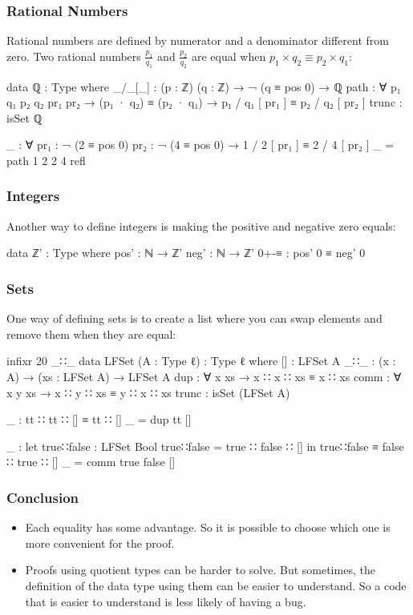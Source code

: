 \documentclass{beamer}
\begin{document}
\begin{frame}
  \frametitle{Rational Numbers}
  Rational numbers are defined by numerator and a denominator different from zero.
  Two rational numbers $ \frac{p_1}{q_1} $ and $ \frac{p_2}{q_2} $ are equal when $ p_1 \times q_2 \equiv p_2 \times q_1 $:
  \begin{code}
  data ℚ : Type where
    _/_[_] : (p : ℤ) (q : ℤ) → ¬ (q ≡ pos 0) → ℚ
    path : ∀ p₁ q₁ p₂ q₂ {pr₁ pr₂} → (p₁ · q₂) ≡ (p₂ · q₁)
      → p₁ / q₁ [ pr₁ ] ≡ p₂ / q₂ [ pr₂ ]
    trunc : isSet ℚ

  _ : ∀ {pr₁ : ¬ (2 ≡ pos 0)} {pr₂ : ¬ (4 ≡ pos 0)}
    → 1 / 2 [ pr₁ ] ≡ 2 / 4 [ pr₂ ]
  _ = path 1 2 2 4 refl
  \end{code}
\end{frame}

\begin{frame}
  \frametitle{Integers}
  Another way to define integers is making the positive and negative zero equals:
  \begin{code}
  data ℤ' : Type where
    pos' : ℕ → ℤ'
    neg' : ℕ → ℤ'
    0+-≡ : pos' 0 ≡ neg' 0
  \end{code}
\end{frame}

\begin{frame}
  \frametitle{Sets}
  One way of defining sets is to create a list where you can swap elements and remove them when they are equal:
  \begin{code}
  infixr 20 _∷_
  data LFSet (A : Type ℓ) : Type ℓ where
    []    : LFSet A
    _∷_   : (x : A) → (xs : LFSet A) → LFSet A
    dup   : ∀ x xs   → x ∷ x ∷ xs ≡ x ∷ xs
    comm  : ∀ x y xs → x ∷ y ∷ xs ≡ y ∷ x ∷ xs
    trunc : isSet (LFSet A)

  _ : tt ∷ tt ∷ [] ≡ tt ∷ []
  _ = dup tt []

  _ : let true∷false : LFSet Bool
          true∷false = true ∷ false ∷ []
      in true∷false ≡ false ∷ true ∷ []
  _ = comm true false []
  \end{code}
\end{frame}

\begin{frame}
  \frametitle{Conclusion}
  \begin{itemize}
    \item Each equality has some advantage.
      So it is possible to choose which one is more convenient for the proof.
    \item Proofs using quotient types can be harder to solve.
      But sometimes, the definition of the data type using them can be easier to understand.
      So a code that is easier to understand is less likely of having a bug.
  \end{itemize}
\end{frame}
\end{document}
